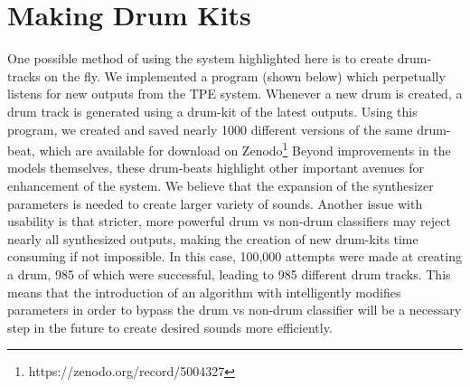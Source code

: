 \documentclass[\main/thesis.tex]{subfiles}
\begin{document}
\section{Making Drum Kits}
One possible method of using the system highlighted here is to create drum-tracks on the fly. We implemented a program (shown below) which perpetually listens for new outputs from the TPE system. Whenever a new drum is created, a drum track is generated using a drum-kit of the latest outputs. Using this program, we created and saved nearly 1000 different versions of the same drum-beat, which are available for download on Zenodo\footnote{https://zenodo.org/record/5004327} Beyond improvements in the models themselves, these drum-beats highlight other important avenues for enhancement of the system. We believe that the expansion of the synthesizer parameters is needed to create larger variety of sounds. Another issue with usability is that stricter, more powerful drum vs non-drum classifiers may reject nearly all synthesized outputs, making the creation of new drum-kits time consuming if not impossible. In this case, 100,000 attempts were made at creating a drum, 985 of which were successful, leading to 985 different drum tracks. This means that the introduction of an algorithm with intelligently modifies parameters in order to bypass the drum vs non-drum classifier will be a necessary step in the future to create desired sounds more efficiently. 



\end{document}

